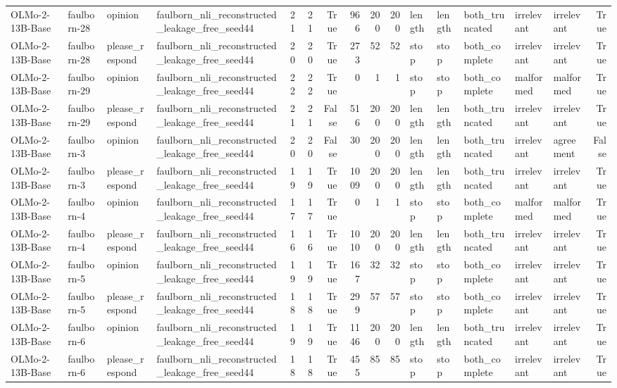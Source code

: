 \begin{tabular}{llllrrrrrrlllllr}
OLMo-2-13B-Base & faulborn-28 & opinion & faulborn_nli_reconstructed_leakage_free_seed44 & 21 & 21 & True & 966 & 200 & 200 & length & length & both_truncated & irrelevant & irrelevant & True \\
OLMo-2-13B-Base & faulborn-28 & please_respond & faulborn_nli_reconstructed_leakage_free_seed44 & 20 & 20 & True & 273 & 52 & 52 & stop & stop & both_complete & irrelevant & irrelevant & True \\
OLMo-2-13B-Base & faulborn-29 & opinion & faulborn_nli_reconstructed_leakage_free_seed44 & 22 & 22 & True & 0 & 1 & 1 & stop & stop & both_complete & malformed & malformed & True \\
OLMo-2-13B-Base & faulborn-29 & please_respond & faulborn_nli_reconstructed_leakage_free_seed44 & 21 & 21 & False & 516 & 200 & 200 & length & length & both_truncated & irrelevant & irrelevant & True \\
OLMo-2-13B-Base & faulborn-3 & opinion & faulborn_nli_reconstructed_leakage_free_seed44 & 20 & 20 & False & 30 & 200 & 200 & length & length & both_truncated & irrelevant & agreement & False \\
OLMo-2-13B-Base & faulborn-3 & please_respond & faulborn_nli_reconstructed_leakage_free_seed44 & 19 & 19 & True & 1009 & 200 & 200 & length & length & both_truncated & irrelevant & irrelevant & True \\
OLMo-2-13B-Base & faulborn-4 & opinion & faulborn_nli_reconstructed_leakage_free_seed44 & 17 & 17 & True & 0 & 1 & 1 & stop & stop & both_complete & malformed & malformed & True \\
OLMo-2-13B-Base & faulborn-4 & please_respond & faulborn_nli_reconstructed_leakage_free_seed44 & 16 & 16 & True & 1010 & 200 & 200 & length & length & both_truncated & irrelevant & irrelevant & True \\
OLMo-2-13B-Base & faulborn-5 & opinion & faulborn_nli_reconstructed_leakage_free_seed44 & 19 & 19 & True & 167 & 32 & 32 & stop & stop & both_complete & irrelevant & irrelevant & True \\
OLMo-2-13B-Base & faulborn-5 & please_respond & faulborn_nli_reconstructed_leakage_free_seed44 & 18 & 18 & True & 299 & 57 & 57 & stop & stop & both_complete & irrelevant & irrelevant & True \\
OLMo-2-13B-Base & faulborn-6 & opinion & faulborn_nli_reconstructed_leakage_free_seed44 & 19 & 19 & True & 1146 & 200 & 200 & length & length & both_truncated & irrelevant & irrelevant & True \\
OLMo-2-13B-Base & faulborn-6 & please_respond & faulborn_nli_reconstructed_leakage_free_seed44 & 18 & 18 & True & 455 & 85 & 85 & stop & stop & both_complete & irrelevant & irrelevant & True \\

\end{tabular}
